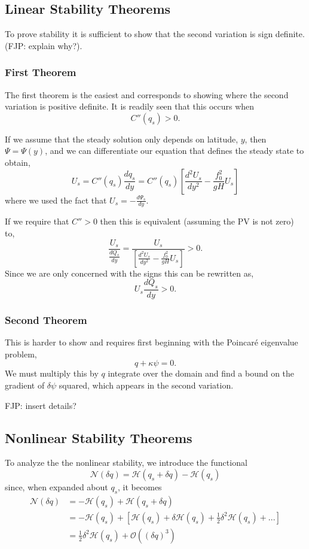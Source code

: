 \documentclass[12pt]{article}
\begin{document}
  \subsection{Linear Stability Theorems}
  To prove stability it is sufficient to show that the second variation is sign definite. (FJP: explain why?).  
  
  \subsubsection{First Theorem}
    The first theorem is the easiest and corresponds to showing where the second variation is positive definite.  It is readily seen that this occurs when
    $$
    C''(q_s) > 0.
    $$
  
    If we assume that the steady solution only depends on latitude, $y$, then $\Psi = \Psi(y)$, and we can differentiate our equation that defines the steady state to obtain,
    $$
    U_s = C''(q_s) \frac{dq_s}{dy} = C''(q_s) \left[ \frac{d^2 U_s}{dy^2} - \frac{f_0^2}{gH} U_s \right]
    $$
    where we used the fact that $U_s = - \frac{d \Psi_s}{dy}$.
    
    If we require that $C'' > 0$ then this is equivalent (assuming the PV is not zero) to,
    $$
    \frac{U_s}{\frac{dQ_s}{dy}} = \frac{U_s}{\left[ \frac{d^2 U_s}{dy^2} - \frac{f_0^2}{gH} U_s\right]} > 0.
    $$
    Since we are only concerned with the signs this can be rewritten as,
    $$
    U_s \frac{d Q_s}{dy} > 0.
    $$
  
  \subsubsection{Second Theorem}
    This is harder to show and requires first beginning with the Poincar\'e eigenvalue problem,
    $$
    q + \kappa \psi = 0.
    $$
    We must multiply this by $q$ integrate over the domain and find a bound on the gradient of $\delta \psi$ squared, which appears in the second variation.
    
    FJP: insert details?
  
  \subsection{Nonlinear Stability Theorems}
  
    To analyze the the nonlinear stability, we introduce the functional
    $$
    \mathcal{N}(\delta q)  = \mathcal{H}(q_s + \delta q) - \mathcal{H}(q_s)
    $$
    since, when expanded about $q_s$, it becomes
    \begin{align*}
      \mathcal{N}(\delta q) 
      &= - \mathcal{H}(q_s) + \mathcal{H}(q_s + \delta q) \\
      & = - \mathcal{H}(q_s) + \left[ \mathcal{H}(q_s) + \delta \mathcal{H}(q_s)+ \frac12 \delta^2 \mathcal{H}(q_s) + ... \right] \\
      &= \frac12 \delta^2 \mathcal{H}(q_s) + \mathcal{O}((\delta q)^3)
    \end{align*}
  
\end{document}
